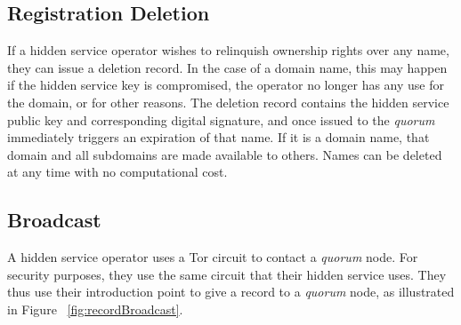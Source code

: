 \subsection{Registration Deletion}

If a hidden service operator wishes to relinquish ownership rights over any name, they can issue a deletion record. In the case of a domain name, this may happen if the hidden service key is compromised, the operator no longer has any use for the domain, or for other reasons. The deletion record contains the hidden service public key and corresponding digital signature, and once issued to the \emph{quorum} immediately triggers an expiration of that name. If it is a domain name, that domain and all subdomains are made available to others. Names can be deleted at any time with no computational cost.

\subsection{Broadcast}

A hidden service operator uses a Tor circuit to contact a \emph{quorum} node. For security purposes, they use the same circuit that their hidden service uses. They thus use their introduction point to give a record to a \emph{quorum} node, as illustrated in Figure ~\ref{fig:recordBroadcast}.

